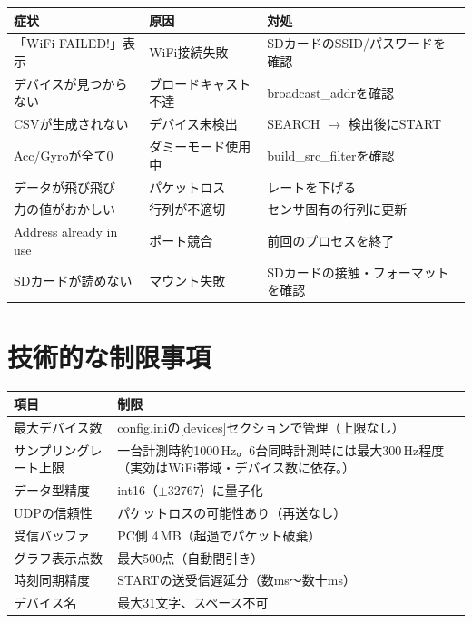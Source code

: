 \documentclass[a4paper,10pt]{ltjsarticle}
\begin{document}
\begin{table}[h]
\centering
\small
\begin{tabular}{lll}
\toprule
\textbf{症状} & \textbf{原因} & \textbf{対処} \\
\midrule
「WiFi FAILED!」表示          & WiFi接続失敗        & SDカードのSSID/パスワードを確認 \\
デバイスが見つからない         & ブロードキャスト不達   & broadcast\_addrを確認 \\
CSVが生成されない             & デバイス未検出       & SEARCH $\to$ 検出後にSTART \\
Acc/Gyroが全て0              & ダミーモード使用中    & build\_src\_filterを確認 \\
データが飛び飛び              & パケットロス         & レートを下げる \\
力の値がおかしい              & 行列が不適切         & センサ固有の行列に更新 \\
Address already in use       & ポート競合           & 前回のプロセスを終了 \\
SDカードが読めない            & マウント失敗         & SDカードの接触・フォーマットを確認 \\
\bottomrule
\end{tabular}
\end{table}

\section{技術的な制限事項}

\begin{table}[h]
\centering
\begin{tabular}{ll}
\toprule
\textbf{項目} & \textbf{制限} \\
\midrule
最大デバイス数          & config.iniの[devices]セクションで管理（上限なし） \\
サンプリングレート上限    & 一台計測時約1000\,Hz。6台同時計測時には最大300\,Hz程度（実効はWiFi帯域・デバイス数に依存。） \\
データ型精度            & int16（$\pm$32767）に量子化 \\
UDPの信頼性            & パケットロスの可能性あり（再送なし） \\
受信バッファ            & PC側 4\,MB（超過でパケット破棄） \\
グラフ表示点数          & 最大500点（自動間引き） \\
時刻同期精度            & STARTの送受信遅延分（数ms〜数十ms） \\
デバイス名             & 最大31文字、スペース不可 \\
\bottomrule
\end{tabular}
\end{table}
\end{document}

